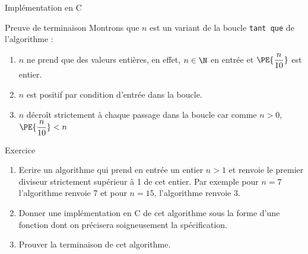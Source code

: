 \documentclass[10pt,french]{beamer}
\begin{document}
\begin{frame}{\Ctitle}{\stitle}
	\begin{exampleblock}{Implémentation en C}
	\end{exampleblock}
\end{frame}

\begin{frame}{\Ctitle}{\stitle}
	\begin{exampleblock}{Preuve de terminaison}
		Montrons que $n$ est un variant de la boucle {\tt tant que} de l'algorithme :
		\begin{enumerate}
		\item<1-> $n$ ne prend que des valeurs entières, en effet, $n \in \N$  en entrée et $\PE{\dfrac{n}{10}}$ est entier.
		\item<2-> $n$ est positif  par condition d'entrée dans la boucle. 
		\item<3-> $n$ décroît strictement à chaque passage dans la boucle car comme $n > 0$, $\PE{\dfrac{n}{10}} < n$
		\end{enumerate}
	\end{exampleblock}
\end{frame}

\begin{frame}{\Ctitle}{\stitle}
	\begin{exampleblock}{Exercice}
		\begin{enumerate}
		\item<1-> Ecrire un algorithme qui prend en entrée un entier $n>1$ et renvoie le premier diviseur strictement supérieur à 1 de cet entier. Par exemple pour $n=7$ l'algorithme renvoie 7 et pour $n=15$, l'algorithme renvoie $3$.
		\item<2-> Donner une implémentation en C de cet algorithme sous la forme d'une fonction dont on précisera soigneusement la spécification.
		\item<3-> Prouver la terminaison de cet algorithme.
		\end{enumerate}
	\end{exampleblock}
\end{frame}
\end{document}

